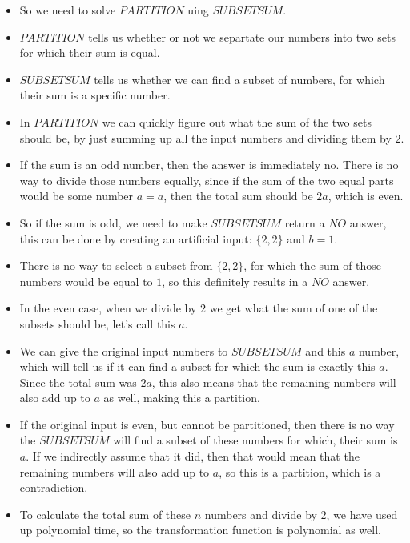 \begin{itemize}
    \item So we need to solve $PARTITION$ uing $SUBSETSUM$.
    \item $PARTITION$ tells us whether or not we separtate our numbers into two sets for which their sum is equal.
    \item $SUBSETSUM$ tells us whether we can find a subset of numbers, for which their sum is a specific number.
    \item In $PARTITION$ we can quickly figure out what the sum of the two sets should be, by just summing up all the input numbers and dividing them by $2$.
    \item If the sum is an odd number, then the answer is immediately no. There is no way to divide those numbers equally, since if the sum of the two equal parts would be some number $a=a$, then the total sum should be $2a$, which is even.
    \item So if the sum is odd, we need to make $SUBSETSUM$ return a $NO$ answer, this can be done by creating an artificial input: $\{2,2\}$ and $b=1$. 
    \item There is no way to select a subset from $\{2,2\}$, for which the sum of those numbers would be equal to $1$, so this definitely results in a $NO$ answer.
    \item In the even case, when we divide by $2$ we get what the sum of one of the subsets should be, let's call this $a$.
    \item We can give the original input numbers to $SUBSETSUM$ and this $a$ number, which will tell us if it can find a subset for which the sum is exactly this $a$. Since the total sum was $2a$, this also means that the remaining numbers will also add up to $a$ as well, making this a partition.
    \item If the original input is even, but cannot be partitioned, then there is no way the $SUBSETSUM$ will find a subset of these numbers for which, their sum is $a$. If we indirectly assume that it did, then that would mean that the remaining numbers will also add up to $a$, so this is a partition, which is a contradiction.
    \item To calculate the total sum of these $n$ numbers and divide by $2$, we have used up polynomial time, so the transformation function is polynomial as well.
\end{itemize}